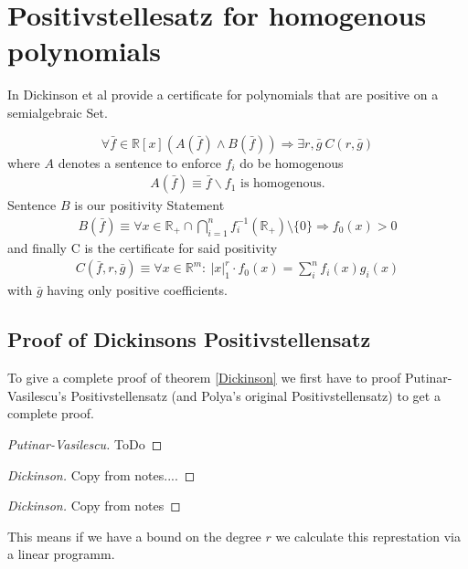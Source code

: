 \documentclass[./main.tex]{subfiles}
\begin{document}
\section{Positivstellesatz for homogenous polynomials}
\label{secDick}
In \cite{dickinson2015extension} Dickinson et al  provide a certificate for polynomials that are positive on a semialgebraic Set.
\begin{thm}
\label{Dickinson}
\begin{equation}
\forall \bar{f} \in \mathbb{R}[x] \left( A(\bar{f}) \wedge B(\bar{f}) \right) \Rightarrow \exists r, \bar{g} \  C(r,\bar{g})
\end{equation}
where $A$ denotes a sentence to enforce $f_i$ do be homogenous
\begin{align*}
A(\bar{f}) \equiv \bar f \backslash f_1 \text{ is homogenous}.
\end{align*}
Sentence $B$ is our positivity Statement
\begin{align*}
B(\bar f ) \equiv \forall x \in \mathbb{R}_+\cap \bigcap_{i=1}^n f_i^{-1}(\mathbb R_+) \setminus \lbrace 0 \rbrace \Rightarrow f_0(x) >0 
\end{align*}
and finally C is the certificate for said positivity
\begin{align*}
C(\bar f ,r, \bar g) \equiv \forall x \in \mathbb{R}^m : \ \vert x \vert_1^r \cdot f_0(x) = \sum_i^n f_i(x)g_i(x) 
\end{align*}
with $\bar g$ having only positive coefficients.
\end{thm}
\subsection{Proof of Dickinsons Positivstellensatz}
To give a complete proof of  theorem \ref{Dickinson} we first have to proof Putinar-Vasilescu’s Positivstellensatz \cite{putinar1999positive} (and Polya's original Positivstellensatz) to get a complete proof.
\begin{proof}[Putinar-Vasilescu]
ToDo
\end{proof}


\begin{proof}[Dickinson]
Copy from notes....
\end{proof}


\begin{proof}[Dickinson]
Copy from notes
\end{proof}
This means if we have a bound on the degree $r$ we calculate this represtation via a linear programm.
\end{document}
